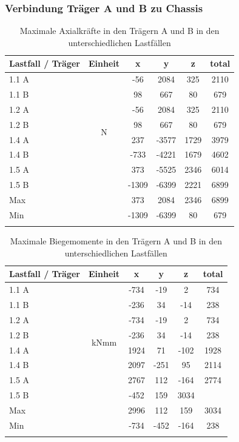 \subsubsection{Verbindung Träger A und B zu Chassis}
\begin{table}[H]
\centering
\begin{tabular}{lccccc}
\thickhline
Lastfall / Träger	&	Einheit	&	x	&	y	&	z	&	total	\\	\hline
1.1 A	&	\multirow{8}{*}{N}	&	-56	&	2084	&	325	&	2110	\\
1.1 B	&		&	98	&	667	&	80	&	679	\\
1.2 A	&		&	-56	&	2084	&	325	&	2110	\\
1.2 B	&		&	98	&	667	&	80	&	679	\\
1.4 A	&		&	237	&	-3577	&	1729	&	3979	\\
1.4 B	&		&	-733	&	-4221	&	1679	&	4602	\\
1.5 A	&		&	373	&	-5525	&	2346	&	6014	\\
1.5 B	&		&	-1309	&	-6399	&	2221	&	6899	\\	\hline
Max	&		&	373	&	2084	&	2346	&	6899	\\
Min	&		&	-1309	&	-6399	&	80	&	679	\\	\thickhline
\end{tabular}
\caption{Maximale Axialkräfte in den Trägern A und B in den unterschiedlichen Lastfällen}
\label{tab:FEMres Träger Axial}
\end{table}

\begin{table}[H]
\centering
\begin{tabular}{lccccc}
\thickhline
Lastfall / Träger	&	Einheit	&	x	&	y	&	z	&	total	\\	\hline
1.1 A	&	\multirow{8}{*}{kNmm}	&	-734	&	-19	&	2	&	734	\\
1.1 B	&		&	-236	&	34	&	-14	&	238	\\
1.2 A	&		&	-734	&	-19	&	2	&	734	\\
1.2 B	&		&	-236	&	34	&	-14	&	238	\\
1.4 A	&		&	1924	&	71	&	-102	&	1928	\\
1.4 B	&		&	2097	&	-251	&	95	&	2114	\\
1.5 A	&		&	2767	&	112	&	-164	&	2774	\\
1.5 B	&		0	2996	&	-452	&	159	&	3034	\\	\hline
Max	&		&	2996	&	112	&	159	&	3034	\\
Min	&		&	-734	&	-452	&	-164	&	238	\\	\thickhline
\end{tabular}
\caption{Maximale Biegemomente in den Trägern A und B in den unterschiedlichen Lastfällen}
\label{tab:FEMres Träger Moment}
\end{table}


